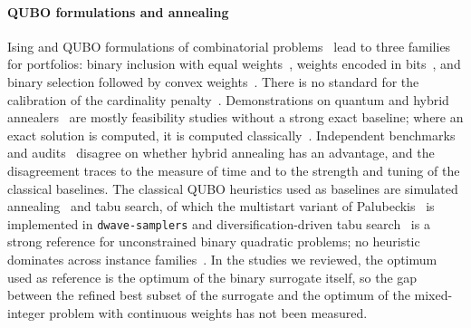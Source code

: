 \paragraph{QUBO formulations and annealing} Ising and QUBO formulations of combinatorial problems~\cite{lucas2014ising,glover2019quantum}
lead to three families for portfolios: binary inclusion with equal
weights~\cite{brandhofer2022benchmarking,kilic2026reproducible,lozano2026where}, weights encoded in
bits~\cite{mugel2022dynamic,stopfer2025quantum}, and binary selection followed by convex weights~\cite{morapakula2025endtoend}.
There is no standard for the calibration of the cardinality penalty~\cite{hodson2019portfolio,verma2022penalty,lozano2026penalty}.
Demonstrations on quantum and hybrid annealers~\cite{venturelli2019reverse,grant2021benchmarking,mugel2022dynamic,lang2022strategic,morapakula2025endtoend}
are mostly feasibility studies without a strong exact baseline; where an exact solution is computed, it is computed
classically~\cite{sakuler2025real}. Independent benchmarks and
audits~\cite{kim2025quantum,stopfer2025quantum,chen2025benchmarking,lozano2026where,lozano2026penalty} disagree on whether
hybrid annealing has an advantage, and the disagreement traces to the measure of time and to the strength and tuning of
the classical baselines. The classical QUBO heuristics used as baselines are simulated
annealing~\cite{kirkpatrick1983optimization} and tabu search, of which the multistart variant of
Palubeckis~\cite{palubeckis2004multistart} is implemented in \texttt{dwave-samplers} and diversification-driven tabu
search~\cite{glover2010diversification} is a strong reference for unconstrained binary quadratic problems; no heuristic
dominates across instance families~\cite{dunning2018what}. In the studies we reviewed, the optimum used as reference is
the optimum of the binary surrogate itself, so the gap between the refined best subset of the surrogate and the optimum
of the mixed-integer problem with continuous weights has not been measured.


